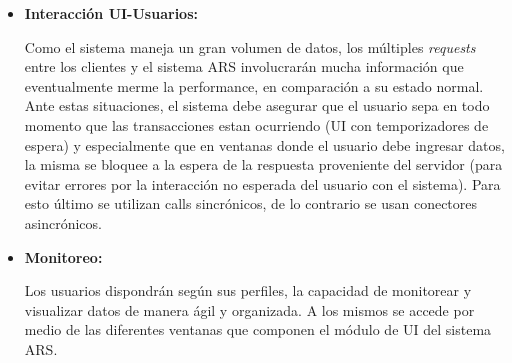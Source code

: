 \begin{itemize}
    \item \textbf{Interacción UI-Usuarios:} 
    \par Como el sistema maneja un gran volumen de datos, los múltiples \textit{requests} entre los clientes y el sistema ARS involucrarán mucha información que eventualmente merme la performance, en comparación a su estado normal. Ante estas situaciones, el sistema debe asegurar que el usuario sepa en todo momento que las transacciones estan ocurriendo (UI con temporizadores de espera) y especialmente que en ventanas donde el usuario debe ingresar datos, la misma se bloquee a la espera de la respuesta proveniente del servidor (para evitar errores por la interacción no esperada del usuario con el sistema). Para esto último se utilizan calls sincrónicos, de lo contrario se usan conectores asincrónicos.
    \item \textbf{Monitoreo:} 
    \par Los usuarios dispondrán según sus perfiles, la capacidad de monitorear y visualizar datos de manera ágil y organizada. A los mismos se accede por medio de las diferentes ventanas que componen el módulo de UI del sistema ARS. 
\end{itemize}
